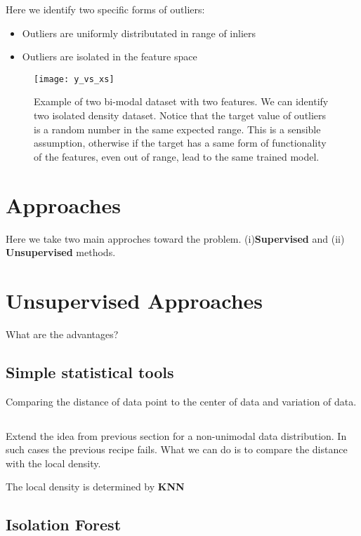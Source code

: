 \documentclass{article}
\begin{document}
Here we identify two specific forms of outliers:

\begin{itemize}  
\item Outliers are uniformly distributated in range of inliers
\item Outliers are isolated in the feature space
\end{itemize}

\begin{figure}[h]
  \centering
  \texttt{[image: y\_vs\_xs]}
  \caption{Example of two bi-modal dataset with two features. We can
    identify two isolated density dataset. Notice that the target
    value of outliers is a random number in the same expected
    range. This is a sensible assumption, otherwise if the target has
    a same form of functionality of the features, even out of range,
    lead to the same trained model.  }
\end{figure}


\section{Approaches}
Here we take two main approches toward the problem. (i){\bf Supervised} and (ii) {\bf Unsupervised} methods.


\section{Unsupervised Approaches}
What are the advantages?

\subsection{Simple statistical tools}

Comparing the distance of data point to the center of data and variation of data.

\subsection{}

Extend the idea from previous section for a non-unimodal data distribution. In such cases the previous recipe fails. What we can do is to compare the distance with the local density.

The local density is determined by {\bf KNN}

\subsection{Isolation Forest}
\end{document}

